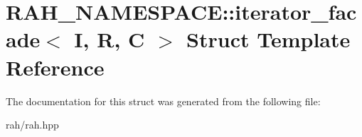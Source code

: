 \hypertarget{struct_r_a_h___n_a_m_e_s_p_a_c_e_1_1iterator__facade}{}\section{R\+A\+H\+\_\+\+N\+A\+M\+E\+S\+P\+A\+CE\+::iterator\+\_\+facade$<$ I, R, C $>$ Struct Template Reference}
\label{struct_r_a_h___n_a_m_e_s_p_a_c_e_1_1iterator__facade}


The documentation for this struct was generated from the following file\+:\begin{DoxyCompactItemize}
\item 
rah/rah.\+hpp\end{DoxyCompactItemize}
